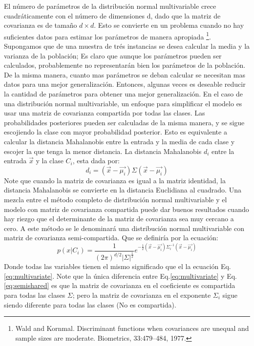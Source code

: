 \documentclass[a4paper, 11pt, oneside]{report}
\begin{document}
El número de parámetros de la distribución normal multivariable crece cuadráticamente con el número de dimensiones d, dado que la matriz de covarianza es de tamaño $d \times d$. Esto se convierte en un problema cuando no hay suficientes datos para estimar los parámetros de manera apropiada \footnote{Wald and Kornmal. Discriminant functions when covariances are unequal and sample sizes are moderate. Biometrics, 33:479–484, 1977.}. Supongamos que de una muestra de trés instancias se desea calcular la media y la varianza de la población; Es claro que aunque los parámetros pueden ser calculados, probablemente no representarán bien los parámetros de la población. De la misma manera, cuanto mas parámetros se deban calcular se necesitan mas datos para una mejor generalización.\newline \newline
Entonces, algunas veces es deseable reducir la cantidad de parámetros para obtener una mejor generalización. En el caso de una distribución normal multivariable, un enfoque para simplificar el modelo es usar una matriz de covarianza compartida por todas las clases. Las probabilidades posteriores pueden ser calculadas de la misma manera, y se sigue escojiendo la clase con mayor probabilidad posterior. Esto es equivalente a calcular la distancia Mahalanobis entre la entrada y la media de cada clase y escojer la que tenga la menor distancia. La distancia Mahalanobis $d_i$ entre la entrada $\vec{x}$ y la clase $C_i$, esta dada por:
\begin{equation}
\label{eq:mahalanobis}
 d_i = (\vec{x}-\vec{\mu_i})\Sigma(\vec{x}-\vec{\mu_i}) 
\end{equation}
Note que cuando la matriz de covarianza es igual a la matriz identidad, la distancia Mahalanobis se convierte en la distancia Euclidiana al cuadrado.\newline \newline
Una mezcla entre el método completo de distribución normal multivariable y el modelo con matriz de covarianza compartida puede dar buenos resultados cuando hay riezgo que el determinante de la matriz de covarianza sea muy cercano a cero. A este método se le denominará una distribución normal multivariable con matriz de covarianza semi-compartida. Que se definiría por la ecuación:
\begin{equation}\label{eq:semishared}
	p(x|C_i) = \frac{1}{(2\pi)^{d/2}|\Sigma|^\frac{1}{2}} e^{-\frac{1}{2}(\vec{x}-\vec{\mu_i})\Sigma_i^{-1}(\vec{x}-\vec{\mu_i})}
\end{equation}
Donde todas las variables tienen el mismo significado que el la ecuación Eq.\ref{eq:multivariate}. Note que la única diferencia entre Eq.\ref{eq:multivariate} y Eq.\ref{eq:semishared} es que la matriz de covarianza en el coeficiente es compartida para todas las clases $\Sigma$; pero la matriz de covarianza en el exponente $\Sigma_i$ sigue siendo diferente para todas las clases (No es compartida).	
	
\end{document}
